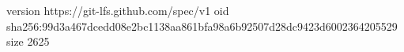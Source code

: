 version https://git-lfs.github.com/spec/v1
oid sha256:99d3a467dcedd08e2bc1138aa861bfa98a6b92507d28dc9423d6002364205529
size 2625
